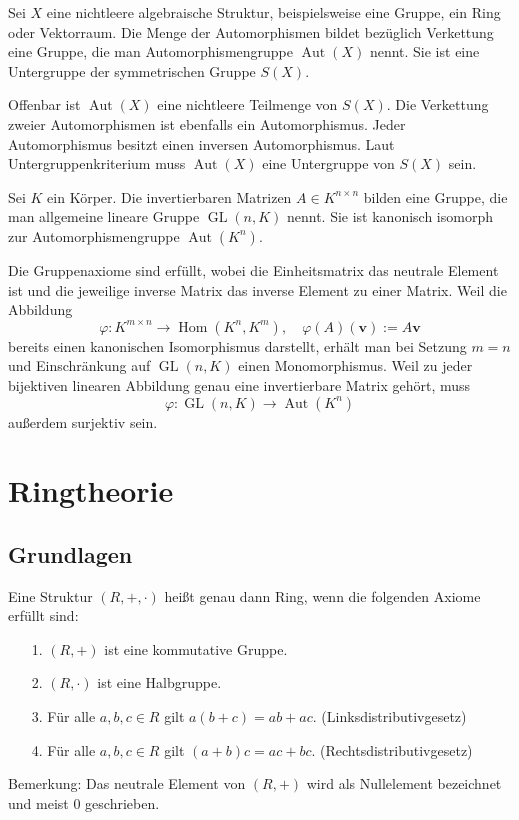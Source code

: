 \begin{Korollar}
Sei $X$ eine nichtleere algebraische Struktur, beispielsweise eine
Gruppe, ein Ring oder Vektorraum. Die Menge der Automorphismen bildet
bezüglich Verkettung eine Gruppe, die man Automorphismengruppe
$\operatorname{Aut}(X)$ nennt. Sie ist eine Untergruppe der
symmetrischen Gruppe $S(X)$.  
\end{Korollar}
\begin{Beweis}
Offenbar ist $\operatorname{Aut}(X)$ eine nichtleere Teilmenge von
$S(X)$. Die Verkettung zweier Automorphismen ist ebenfalls ein
Automorphismus. Jeder Automorphismus besitzt einen inversen
Automorphismus. Laut Untergruppenkriterium muss $\operatorname{Aut}(X)$
eine Untergruppe von $S(X)$ sein.\,\qedsymbol
\end{Beweis}

\begin{Korollar}
Sei $K$ ein Körper. Die invertierbaren Matrizen $A\in K^{n\times n}$
bilden eine Gruppe, die man allgemeine lineare Gruppe
$\operatorname{GL}(n,K)$ nennt. Sie ist kanonisch isomorph zur
Automorphismengruppe $\operatorname{Aut}(K^n)$.
\end{Korollar}
\begin{Beweis}
Die Gruppenaxiome sind erfüllt, wobei die Einheitsmatrix das
neutrale Element ist und die jeweilige inverse Matrix das
inverse Element zu einer Matrix. Weil die Abbildung%
\[\varphi\colon K^{m\times n}\to\operatorname{Hom}(K^n,K^m),\quad
\varphi(A)(\mathbf v) := A\mathbf v\]
bereits einen kanonischen Isomorphismus darstellt, erhält man bei
Setzung $m=n$ und Einschränkung auf $\operatorname{GL}(n,K)$
einen Monomorphismus. Weil zu jeder bijektiven linearen Abbildung genau
eine invertierbare Matrix gehört, muss%
\[\varphi\colon\operatorname{GL}(n,K)\to\operatorname{Aut}(K^n)\]
außerdem surjektiv sein.\,\qedsymbol
\end{Beweis}

\newpage
\section{Ringtheorie}

\subsection{Grundlagen}

\begin{Definition}[Ring]
Eine Struktur $(R,+,\cdot)$ heißt genau dann Ring, wenn die folgenden
Axiome erfüllt sind:
\begin{enumerate}
\item[1.] $(R,+)$ ist eine kommutative Gruppe.
\item[2.] $(R,\cdot)$ ist eine Halbgruppe.
\item[3.] Für alle $a,b,c\in R$ gilt $a(b+c) = ab+ac$. (Linksdistributivgesetz)
\item[4.] Für alle $a,b,c\in R$ gilt $(a+b)c = ac+bc$. (Rechtsdistributivgesetz)
\end{enumerate}
\end{Definition}
Bemerkung: Das neutrale Element von $(R,+)$ wird als Nullelement
bezeichnet und meist $0$ geschrieben.

